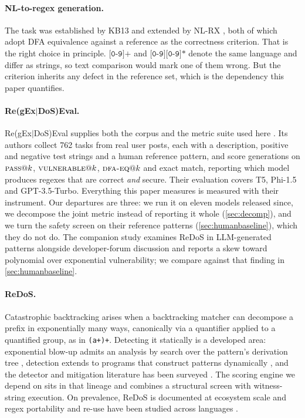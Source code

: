 \documentclass[11pt]{article}
\newcommand{\pass}{\textsc{pass}}
\newcommand{\vuln}{\textsc{vulnerable}}
\newcommand{\dfaeq}{\textsc{dfa-eq}}
\begin{document}
\paragraph{NL-to-regex generation.}
The task was established by KB13 \citep{kushman2013semantic} and extended by
NL-RX \citep{locascio2016neural}, both of which adopt DFA equivalence
against a reference as the correctness criterion. That is the right choice in
principle. $\texttt{[0-9]+}$ and
$\texttt{[0-9][0-9]*}$ denote the same language and differ as strings, so
text comparison would mark one of them wrong. But the criterion inherits any
defect in the reference set, which is the dependency this paper quantifies.

\paragraph{Re(gEx$|$DoS)Eval.}
Re(gEx$|$DoS)Eval supplies both the corpus and the metric suite used here
\citep{siddiq2024regexeval}. Its authors collect 762 tasks from real user posts, each with a description,
positive and negative test strings and a human reference pattern, and score
generations on $\pass{}@k$, $\vuln{}@k$, $\dfaeq{}@k$ and exact match,
reporting which model produces regexes that are correct \emph{and} secure.
Their evaluation covers T5, Phi-1.5 and GPT-3.5-Turbo. Everything this paper
measures is measured with their instrument. Our departures are three: we run
it on eleven models released since, we decompose the joint metric instead of
reporting it whole (\cref{sec:decomp}), and we turn the safety screen on
their reference patterns (\cref{sec:humanbaseline}), which they do not do.
The companion study \citep{siddiq2024redos} examines ReDoS in LLM-generated
patterns alongside developer-forum discussion and reports a skew toward
polynomial over exponential vulnerability; we compare against that finding
in \cref{sec:humanbaseline}.

\paragraph{ReDoS.}
Catastrophic backtracking arises when a backtracking matcher can decompose a
prefix in exponentially many ways, canonically via a quantifier applied to a
quantified group, as in \texttt{(a+)+}. Detecting it statically is a
developed area: exponential blow-up admits an analysis by search over the
pattern's derivation tree \citep{kirrage2013static}, detection extends to
programs that construct patterns dynamically \citep{wustholz2017static}, and
the detector and mitigation literature has been surveyed
\citep{sok2025redos}. The scoring engine we depend on
\citep{regexbench} sits in that lineage and combines a structural screen with
witness-string execution. On prevalence, ReDoS is documented at ecosystem scale \citep{davis2018redos}
and regex portability and re-use have been studied across languages
\citep{davis2019linguafranca}.
\end{document}
